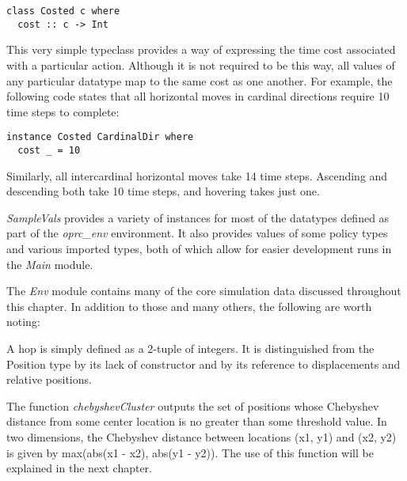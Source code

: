 \begin{verbatim}
class Costed c where
  cost :: c -> Int
\end{verbatim}

This very simple typeclass provides a way of expressing the time cost associated with a particular action. Although it is not required to be this way, all values of any particular datatype map to the same cost as one another. For example, the following code states that all horizontal moves in cardinal directions require 10 time steps to complete: 

\begin{verbatim}
instance Costed CardinalDir where
  cost _ = 10
\end{verbatim}

Similarly, all intercardinal horizontal moves take 14 time steps. Ascending and descending both take 10 time steps, and hovering takes just one.

\textit{SampleVals} provides a variety of instances for most of the datatypes defined as part of the \textit{oprc\_env} environment. It also provides values of some policy types and various imported types, both of which allow for easier development runs in the \textit{Main} module.

The \textit{Env} module contains many of the core simulation data discussed throughout this chapter. In addition to those and many others, the following are worth noting:

A hop is simply defined as a 2-tuple of integers. It is distinguished from the Position type by its lack of constructor and by its reference to displacements and relative positions.

The function \textit{chebyshevCluster} outputs the set of positions whose Chebyshev distance from some center location is no greater than some threshold value. In two dimensions, the Chebyshev distance between locations (x1, y1) and (x2, y2) is given by max(abs(x1 - x2), abs(y1 - y2)). The use of this function will be explained in the next chapter.